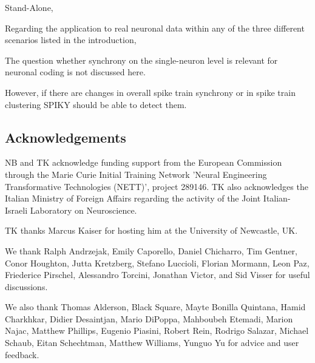 \documentclass[10pt,twocolumn]{elsart5p}
\begin{document}
Stand-Alone, 

%

Regarding the application to real neuronal data within any of the three different scenarios listed in the introduction,

The question whether synchrony on the single-neuron level is relevant for neuronal coding is not discussed here.

However, if there are changes in overall spike train synchrony or in spike train clustering SPIKY should be able to detect them.


\vspace{1cm}

\begin{thanks}
\section{\label{s:Acknowledgement} \textbf{Acknowledgements}}

NB and TK acknowledge funding support from the European Commission through the Marie Curie Initial Training Network 'Neural Engineering Transformative Technologies (NETT)', project 289146. TK also acknowledges the Italian Ministry of Foreign Affairs regarding the activity of the Joint Italian-Israeli Laboratory on Neuroscience.

TK thanks Marcus Kaiser for hosting him at the University of Newcastle, UK.
     
We thank Ralph Andrzejak, Emily Caporello, Daniel Chicharro, Tim Gentner, Conor Houghton, Jutta Kretzberg, Stefano Luccioli, Florian Mormann, Leon Paz, Friederice Pirschel, Alessandro Torcini, Jonathan Victor, and Sid Visser for useful discussions.

We also thank Thomas Alderson, Black Square, Mayte Bonilla Quintana, Hamid Charkhkar, Didier Desaintjan, Mario DiPoppa, Mahboubeh Etemadi, Marion Najac, Matthew Phillips, Eugenio Piasini, Robert Rein, Rodrigo Salazar, Michael Schaub, Eitan Schechtman, Matthew Williams, Yunguo Yu for advice and user feedback.
\end{thanks}
\end{document}
